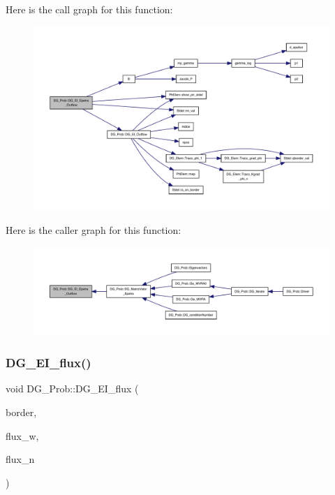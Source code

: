 Here is the call graph for this function\+:
\nopagebreak
\begin{figure}[H]
\begin{center}
\leavevmode
\includegraphics[width=350pt]{classDG__Prob_a7fa0c815d5707dbf3858feb3977f5ee5_cgraph}
\end{center}
\end{figure}
Here is the caller graph for this function\+:
\nopagebreak
\begin{figure}[H]
\begin{center}
\leavevmode
\includegraphics[width=350pt]{classDG__Prob_a7fa0c815d5707dbf3858feb3977f5ee5_icgraph}
\end{center}
\end{figure}
\mbox{\label{classDG__Prob_a68cc239c50661a6856fe3f06b4cdc2c0}} 
\subsubsection{\texorpdfstring{D\+G\+\_\+\+E\+I\+\_\+flux()}{DG\_EI\_flux()}}
{\footnotesize\ttfamily void D\+G\+\_\+\+Prob\+::\+D\+G\+\_\+\+E\+I\+\_\+flux (\begin{DoxyParamCaption}\item[{const \hyperlink{structEDGE}{E\+D\+GE}}]{border,  }\item[{double \&}]{flux\+\_\+w,  }\item[{double \&}]{flux\+\_\+n }\end{DoxyParamCaption})}



